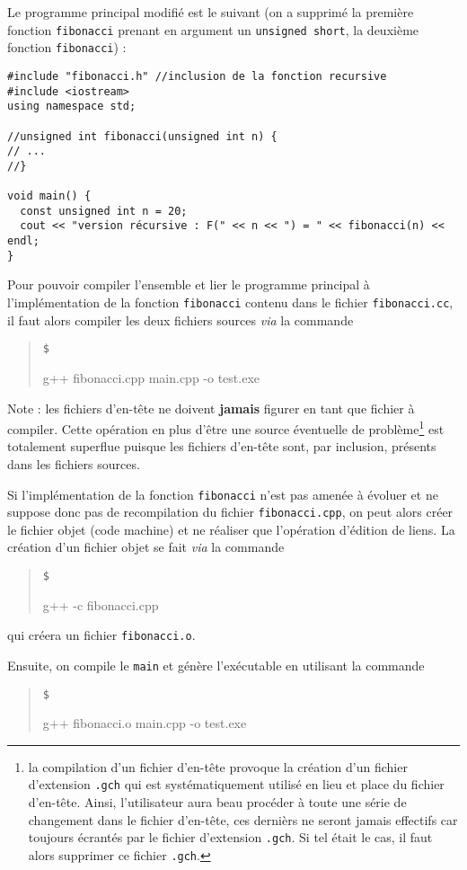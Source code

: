 \documentclass{book}
\newenvironment{prompt}{\begin{quote}\color{blue!75}\tt\$\,
}{\end{quote}}
\begin{document}
\begin{correction}
Le programme principal modifié est le suivant (on a supprimé la première fonction
\texttt{fibonacci} prenant en argument un \texttt{unsigned short}, la deuxième
fonction \texttt{fibonacci}) :

\begin{verbatim}
#include "fibonacci.h" //inclusion de la fonction recursive
#include <iostream>
using namespace std;

//unsigned int fibonacci(unsigned int n) {
// ...
//}

void main() {
  const unsigned int n = 20;
  cout << "version récursive : F(" << n << ") = " << fibonacci(n) << endl;
}
\end{verbatim}

Pour pouvoir compiler l'ensemble et lier le programme principal à
l'implémentation de la fonction \texttt{fibonacci} contenu dans le fichier \texttt{fibonacci.cc},
il faut alors compiler les deux fichiers sources \emph{via} la commande
\begin{prompt}
g++ fibonacci.cpp main.cpp -o test.exe
\end{prompt}
Note : les fichiers d'en-tête ne doivent \textbf{jamais} figurer en tant que fichier à
compiler. Cette opération en plus d'être une source éventuelle de problème\footnote{la compilation d'un fichier d'en-tête provoque la création d'un fichier d'extension \texttt{.gch} qui est systématiquement utilisé en lieu et place du fichier d'en-tête. Ainsi, l'utilisateur aura beau procéder à toute une série de changement dans le fichier d'en-tête, ces dernièrs ne seront jamais effectifs car toujours écrantés par le fichier d'extension \texttt{.gch}. Si tel était le cas, il faut alors supprimer ce fichier \texttt{.gch}.} est totalement superflue puisque les fichiers d'en-tête
sont, par inclusion, présents dans les fichiers sources.

Si l'implémentation de la fonction \texttt{fibonacci} n'est pas amenée à évoluer et ne
suppose donc pas de recompilation du fichier \texttt{fibonacci.cpp}, on peut alors
créer le fichier objet (code machine) et ne réaliser que l'opération d'édition de liens. La création d'un fichier
objet se fait \emph{via} la commande
\begin{prompt}
g++ -c fibonacci.cpp
\end{prompt}
qui créera un fichier \texttt{fibonacci.o}.

Ensuite, on compile le \texttt{main} et génère l'exécutable en utilisant la commande
\begin{prompt}
g++ fibonacci.o main.cpp -o test.exe
\end{prompt}



\end{correction}
\end{document}
